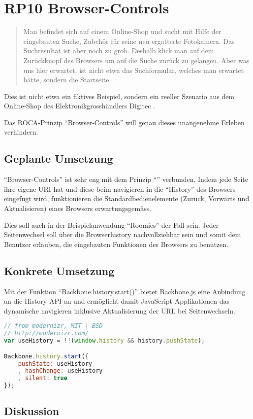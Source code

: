 \section{RP10 Browser-Controls}
\label{sec:principle-rp10-browser-controls}
\begin{quotation}
Man befindet sich auf einem Online-Shop und sucht mit Hilfe der eingebauten Suche, Zubehör für seine neu ergatterte Fotokamera. Das Suchresultat ist aber noch zu grob. Deshalb klick man auf dem Zurückknopf des Browsers um auf die Suche zurück zu gelangen. Aber was uns hier erwartet, ist nicht etwa das Suchformular, welches man erwartet hätte, sondern die Startseite.
\end{quotation}
Dies ist nicht etwa ein fiktives Beispiel, sondern ein reeller Szenario aus dem Online-Shop des Elektronikgrosshändlers Digitec \cite{Digitec}.

Das ROCA-Prinzip ``Browser-Controls'' will genau dieses unangenehme Erleben verhindern.

\subsection*{Geplante Umsetzung}

``Browser-Controls'' ist sehr eng mit dem Prinzip ``'' verbunden. Indem jede Seite ihre eigene \gls{URI} hat und diese beim navigieren in die ``History'' des Browsers eingefügt wird, funktionieren die Standardbedienelemente (Zurück, Vorwärts und Aktualisieren) eines Browsers erwartungsgemäss.

Dies soll auch in der Beispielanwendung ``Roomies'' der Fall sein. Jeder Seitenwechsel soll über die Browserhistory nachvollziehbar sein und somit dem Benutzer erlauben, die eingebauten Funktionen des Browsers zu benutzen.

\subsection*{Konkrete Umsetzung}
Mit der Funktion ``Backbone.history.start()'' \cite{BackbonejsHistory} bietet Backbone.js eine Anbindung an die History API \cite{HistoryAPI} an und ermöglicht damit JavaScript Applikationen das dynamische navigieren inklusive Aktualisierung der URL bei Seitenwechseln.

\begin{lstlisting}[language=JavaScript, caption=Activierung der History in Barefoot \cite{BarefootStartClient}, label=lst:barefootStartClientHistory, firstnumber=29]
// from modernizr, MIT | BSD
// http://modernizr.com/
var useHistory = !!(window.history && history.pushState);

Backbone.history.start({
	pushState: useHistory
	, hashChange: useHistory
	, silent: true
});
\end{lstlisting}

\subsection*{Diskussion}
